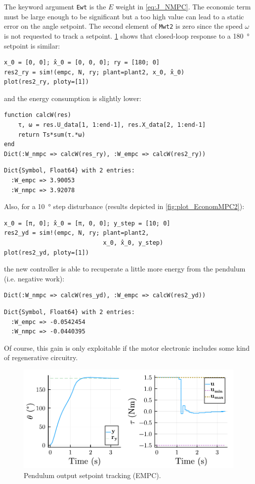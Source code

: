 The keyword argument \texttt{Ewt} is the $E$ weight in \eqref{eq:J_NMPC}. The economic term must be large enough to be significant but a too high value can lead to a static error on the angle setpoint. The second element of \texttt{Mwt2} is zero since the speed $\omega$ is not requested to track a setpoint. \cref{fig:plot_EconomMPC1} shows that closed-loop response to a \SI{180}{\degree} setpoint is similar:
\begin{verbatim}
x_0 = [0, 0]; x̂_0 = [0, 0, 0]; ry = [180; 0]
res2_ry = sim!(empc, N, ry; plant=plant2, x_0, x̂_0)
plot(res2_ry, ploty=[1])
\end{verbatim}
and the energy consumption is slightly lower:
\begin{verbatim}
function calcW(res)
    τ, ω = res.U_data[1, 1:end-1], res.X_data[2, 1:end-1]
    return Ts*sum(τ.*ω)
end
Dict(:W_nmpc => calcW(res_ry), :W_empc => calcW(res2_ry))
\end{verbatim}
\spacerepl
\begin{verbatim}
Dict{Symbol, Float64} with 2 entries:
  :W_empc => 3.90053
  :W_nmpc => 3.92078
\end{verbatim}
Also, for a \SI{10}{\degree} step disturbance (results depicted in \cref{fig:plot_EconomMPC2}):
\begin{verbatim}
x_0 = [π, 0]; x̂_0 = [π, 0, 0]; y_step = [10; 0]
res2_yd = sim!(empc, N, ry; plant=plant2, 
                            x_0, x̂_0, y_step)
plot(res2_yd, ploty=[1])
\end{verbatim}
the new controller is able to recuperate a little more energy from the pendulum (i.e. negative work):
\begin{verbatim}
Dict(:W_nmpc => calcW(res_yd), :W_empc => calcW(res2_yd))
\end{verbatim}
\spacerepl
\begin{verbatim}
Dict{Symbol, Float64} with 2 entries:
  :W_empc => -0.0542454
  :W_nmpc => -0.0440395
\end{verbatim}
Of course, this gain is only exploitable if the motor electronic includes some kind of regenerative circuitry.

\begin{figure}[ht]
    \centering
    \includegraphics[width=\columnwidth]{fig/plot_EconomMPC1.pdf}
    \caption{Pendulum output setpoint tracking (EMPC).}\label{fig:plot_EconomMPC1}
\end{figure}


